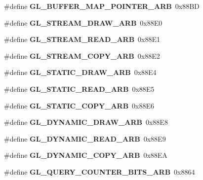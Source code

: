 \begin{DoxyCompactItemize}
\item 
\#define {\bfseries G\+L\+\_\+\+B\+U\+F\+F\+E\+R\+\_\+\+M\+A\+P\+\_\+\+P\+O\+I\+N\+T\+E\+R\+\_\+\+A\+R\+B}~0x88\+B\+D\label{_s_d_l__opengl_8h_af75d1ffa1ce8a2a75fce9f81384f6bc2}

\item 
\#define {\bfseries G\+L\+\_\+\+S\+T\+R\+E\+A\+M\+\_\+\+D\+R\+A\+W\+\_\+\+A\+R\+B}~0x88\+E0\label{_s_d_l__opengl_8h_ae37a7ed05a3194b55fdd38f0ab1ce05b}

\item 
\#define {\bfseries G\+L\+\_\+\+S\+T\+R\+E\+A\+M\+\_\+\+R\+E\+A\+D\+\_\+\+A\+R\+B}~0x88\+E1\label{_s_d_l__opengl_8h_af7ee8b15d3bc29b44d164d30af8259e5}

\item 
\#define {\bfseries G\+L\+\_\+\+S\+T\+R\+E\+A\+M\+\_\+\+C\+O\+P\+Y\+\_\+\+A\+R\+B}~0x88\+E2\label{_s_d_l__opengl_8h_ab8116c517fb5aa039889b208e2d0a5be}

\item 
\#define {\bfseries G\+L\+\_\+\+S\+T\+A\+T\+I\+C\+\_\+\+D\+R\+A\+W\+\_\+\+A\+R\+B}~0x88\+E4\label{_s_d_l__opengl_8h_a52d827f177e657db3ce0c6fdb33a94b7}

\item 
\#define {\bfseries G\+L\+\_\+\+S\+T\+A\+T\+I\+C\+\_\+\+R\+E\+A\+D\+\_\+\+A\+R\+B}~0x88\+E5\label{_s_d_l__opengl_8h_a35ca79d477fe20c1be752a615d373b89}

\item 
\#define {\bfseries G\+L\+\_\+\+S\+T\+A\+T\+I\+C\+\_\+\+C\+O\+P\+Y\+\_\+\+A\+R\+B}~0x88\+E6\label{_s_d_l__opengl_8h_aecd9dc2bd498061b27ff70ec41f27886}

\item 
\#define {\bfseries G\+L\+\_\+\+D\+Y\+N\+A\+M\+I\+C\+\_\+\+D\+R\+A\+W\+\_\+\+A\+R\+B}~0x88\+E8\label{_s_d_l__opengl_8h_a08d478afbd15cb6a37c101dc152f7b0f}

\item 
\#define {\bfseries G\+L\+\_\+\+D\+Y\+N\+A\+M\+I\+C\+\_\+\+R\+E\+A\+D\+\_\+\+A\+R\+B}~0x88\+E9\label{_s_d_l__opengl_8h_a381dcfb8b8bfd7bd1082f82cf0f78535}

\item 
\#define {\bfseries G\+L\+\_\+\+D\+Y\+N\+A\+M\+I\+C\+\_\+\+C\+O\+P\+Y\+\_\+\+A\+R\+B}~0x88\+E\+A\label{_s_d_l__opengl_8h_aab5519bbfacbf59b42f90d4432d92fed}

\item 
\#define {\bfseries G\+L\+\_\+\+Q\+U\+E\+R\+Y\+\_\+\+C\+O\+U\+N\+T\+E\+R\+\_\+\+B\+I\+T\+S\+\_\+\+A\+R\+B}~0x8864\label{_s_d_l__opengl_8h_a300b9a43c952811ad00c3238824af96b}


\end{DoxyCompactItemize}
